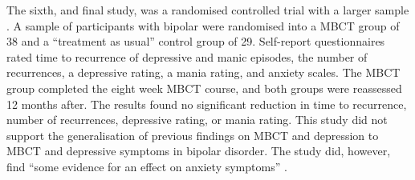 
The sixth, and final study, was a randomised controlled trial with a larger sample \citep{perich_randomized_2013}. A sample of participants with bipolar were randomised into a MBCT group of 38 and a “treatment as usual” control group of 29. Self-report questionnaires rated time to recurrence of depressive and manic episodes, the number of recurrences, a depressive rating, a mania rating, and anxiety scales. The MBCT group completed the eight week MBCT course, and both groups were reassessed 12 months after. The results found no significant reduction in time to recurrence, number of recurrences, depressive rating, or mania rating. This study did not support the generalisation of previous findings on MBCT and depression to MBCT and depressive symptoms in bipolar disorder. The study did, however, find “some evidence for an effect on anxiety symptoms” \citep{perich_randomized_2013}.
  
  